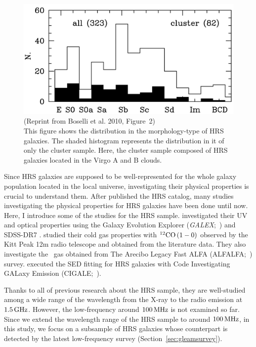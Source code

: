 \begin{figure}[htbp]
	\centering
	\includegraphics[width=.8\linewidth]{Chapter_3/Figures/Boselli2010_Figure2.png}
    \caption[Reprint from Boselli et al. 2010 (Figure~2)]{\label{fig:Boselli2010_figure2}
        (Reprint from Boselli et al. 2010, Figure~2)\\
        This figure shows the distribution in the morphology-type of HRS galaxies.
        The shaded histogram represents the distribution in it of only the cluster sample.
        Here, the cluster sample composed of HRS galaxies located in the Virgo A and B clouds.
    }
\end{figure}

Since HRS galaxies are supposed to be well-represented for the whole galaxy population located in the local universe, investigating their physical properties is crucial to understand them.
After \citet{Boselli2010} published the HRS catalog, many studies investigating the physical properties for HRS galaxies have been done until now.
Here, I introduce some of the studies for the HRS sample.
\citet{Cortese2012} investigated their UV and optical properties using the Galaxy Evolution Explorer ({\it GALEX\/};~\citealt{Martin2005}) and SDSS-DR7 \citep{Abazajian2009}.
\citet{Boselli2014} studied their cold gas properties with $^{12}\mathrm{CO}\left(1-0\right)$ observed by the Kitt Peak 12m radio telescope and obtained from the literature data.
They also investigate the \nh~gas obtained from The Arecibo Legacy Fast ALFA (ALFALFA;~\citealt{Giovanelli2005, Haynes2011}) survey.
\citet{Ciesla2014} executed the SED fitting for HRS galaxies with Code Investigating GALaxy Emission (CIGALE;~\citealt{Noll2009}).

Thanks to all of previous research about the HRS sample, they are well-studied among a wide range of the wavelength from the X-ray to the radio emission at $1.5\,\mathrm{GHz}$.
However, the low-frequency around $100\,\mathrm{MHz}$ is not examined so far.
Since we extend the wavelength range of the HRS sample to around $100\,\mathrm{MHz}$, in this study, we focus on a subsample of HRS galaxies whose counterpart is detected by the latest low-frequency survey (Section~\ref{sec:gleamsurvey}).



